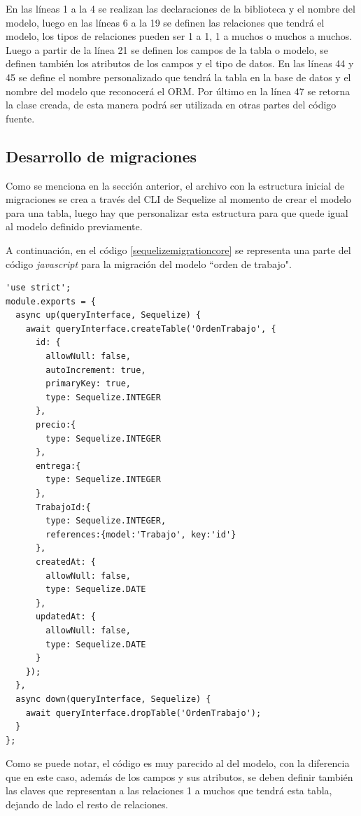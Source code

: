 En las líneas 1 a la 4 se realizan las declaraciones de la biblioteca y el nombre del modelo, 
luego en las líneas 6 a la 19 se definen las relaciones que tendrá el modelo, los tipos de relaciones pueden ser 1 a 1, 1 a muchos o muchos a muchos. Luego a partir de la línea 21 se definen los campos de la tabla o modelo, se definen también los atributos de los campos y el tipo de datos. En las líneas 44 y 45 se define el nombre personalizado que tendrá la tabla en la base de datos y el nombre del modelo que reconocerá el ORM. Por último en la línea 47 se retorna la clase creada, de esta manera podrá ser utilizada en otras partes del código fuente.


\subsection{Desarrollo de migraciones}
\label{subsec:migracionesbasededatos}

Como se menciona en la sección anterior, el archivo con la estructura inicial de migraciones se crea a través del CLI de Sequelize al momento de crear el modelo para una tabla, luego hay que personalizar esta estructura para que quede igual al modelo definido previamente. 

A continuación, en el código \ref{sequelizemigrationcore} se representa una parte del código \textit{javascript} para la migración del modelo ``orden de trabajo".

\begin{lstlisting}[label=cod:sequelizemigrationcore, caption= Código para migración en Sequelize.]
'use strict';
module.exports = {
  async up(queryInterface, Sequelize) {
    await queryInterface.createTable('OrdenTrabajo', {
      id: {
        allowNull: false,
        autoIncrement: true,
        primaryKey: true,
        type: Sequelize.INTEGER
      },
      precio:{
        type: Sequelize.INTEGER
      },
      entrega:{
        type: Sequelize.INTEGER
      },
      TrabajoId:{
        type: Sequelize.INTEGER,
        references:{model:'Trabajo', key:'id'}
      },
      createdAt: {
        allowNull: false,
        type: Sequelize.DATE
      },
      updatedAt: {
        allowNull: false,
        type: Sequelize.DATE
      }
    });
  },
  async down(queryInterface, Sequelize) {
    await queryInterface.dropTable('OrdenTrabajo');
  }
};
\end{lstlisting}

Como se puede notar, el código es muy parecido al del modelo, con la diferencia que en este caso, además de los campos y sus atributos, se deben definir también las claves que representan a las relaciones 1 a muchos que tendrá esta tabla, dejando de lado el resto de relaciones. 

